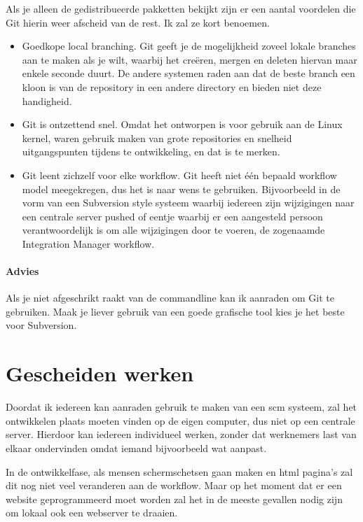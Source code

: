 Als je alleen de gedistribueerde pakketten bekijkt zijn er een aantal voordelen die Git hierin weer afscheid van de rest. Ik zal ze kort benoemen.

\begin{itemize}
  \item Goedkope local branching. Git geeft je de mogelijkheid zoveel lokale branches aan te maken als je wilt, waarbij het creëren, mergen en deleten hiervan maar enkele seconde duurt. De andere systemen raden aan dat de beste branch een kloon is van de repository in een andere directory en bieden niet deze handigheid.
  \item Git is ontzettend snel\cite{whygitisbetterthanx}. Omdat het ontworpen is voor gebruik aan de Linux kernel, waren gebruik maken van grote repositories en snelheid uitgangspunten tijdens te ontwikkeling, en dat is te merken.
  \item Git leent zichzelf voor elke workflow. Git heeft niet één bepaald workflow model meegekregen, dus het is naar wens te gebruiken. Bijvoorbeeld in de vorm van een Subversion style systeem waarbij iedereen zijn wijzigingen naar een centrale server pushed of eentje waarbij er een aangesteld persoon verantwoordelijk is om alle wijzigingen door te voeren, de zogenaamde Integration Manager workflow.
\end{itemize}

\paragraph{Advies} Als je niet afgeschrikt raakt van de commandline kan ik aanraden om Git te gebruiken. Maak je liever gebruik van een goede grafische tool kies je het beste voor Subversion.

\section{Gescheiden werken}

Doordat ik iedereen kan aanraden gebruik te maken van een {\sc scm} systeem, zal het ontwikkelen plaats moeten vinden  op de eigen computer, dus niet op een centrale server. Hierdoor kan iedereen individueel werken, zonder dat werknemers last van elkaar ondervinden omdat iemand bijvoorbeeld wat aanpast.

In de ontwikkelfase, als mensen schermschetsen gaan maken en html pagina's zal dit nog niet veel veranderen aan de workflow. Maar op het moment dat er een website geprogrammeerd moet worden zal het in de meeste gevallen nodig zijn om lokaal ook een webserver te draaien. 

